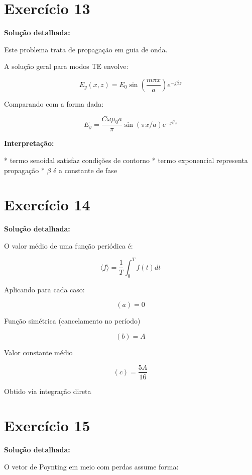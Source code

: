 \documentclass[12pt,a4paper]{article}
\begin{document}
\section*{Exercício 13}

\textbf{Solução detalhada:}

Este problema trata de propagação em guia de onda.

A solução geral para modos TE envolve:

\[
E_y(x,z) = E_0 \sin\left(\frac{m\pi x}{a}\right)e^{-j\beta z}
\]

Comparando com a forma dada:

\[
E_y = \frac{C\omega\mu_0 a}{\pi} \sin(\pi x/a)e^{-j\beta z}
\]

\textbf{Interpretação:}

* termo senoidal satisfaz condições de contorno
* termo exponencial representa propagação
* $\beta$ é a constante de fase

\newpage

\section*{Exercício 14}

\textbf{Solução detalhada:}

O valor médio de uma função periódica é:

\[
\langle f \rangle = \frac{1}{T} \int_0^T f(t) dt
\]

Aplicando para cada caso:

\[
(a) = 0
\]

Função simétrica (cancelamento no período)

\[
(b) = A
\]

Valor constante médio

\[
(c) = \frac{5A}{16}
\]

Obtido via integração direta

\newpage

\section*{Exercício 15}

\textbf{Solução detalhada:}

O vetor de Poynting em meio com perdas assume forma:
\end{document}
